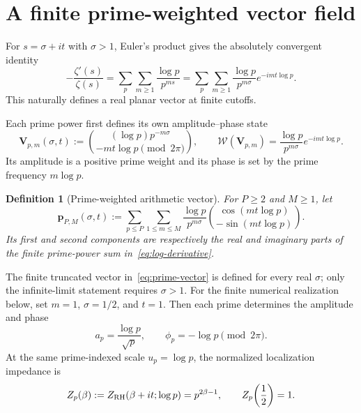 \documentclass[11pt]{article}
\newtheorem{definition}{Definition}[section]
\begin{document}
\section{A finite prime-weighted vector field}
For $s=\sigma+it$ with $\sigma>1$, Euler's product gives the absolutely convergent
identity \cite{Riemann,Titchmarsh,DLMFdefinition}
\begin{equation}\label{eq:log-derivative}
 -\frac{\zeta'(s)}{\zeta(s)}
 =\sum_{p}\sum_{m\ge1}\frac{\log p}{p^{ms}}
 =\sum_p\sum_{m\ge1}\frac{\log p}{p^{m\sigma}}
   e^{-im t\log p}.
\end{equation}
This naturally defines a real planar vector at finite cutoffs.

Each prime power first defines its own amplitude--phase state
\begin{equation}\label{eq:prime-mode-state}
 \mathbf V_{p,m}(\sigma,t)
 :=\binom{(\log p)p^{-m\sigma}}{-mt\log p\pmod{2\pi}},
 \qquad
 \mathcal W(\mathbf V_{p,m})
 =\frac{\log p}{p^{m\sigma}}e^{-imt\log p}.
\end{equation}
Its amplitude is a positive prime weight and its phase is set by the prime frequency
$m\log p$.

\begin{definition}[Prime-weighted arithmetic vector]\label{def:prime-vector}
For $P\ge2$ and $M\ge1$, let
\begin{equation}\label{eq:prime-vector}
 \boxed{
 \mathbf p_{P,M}(\sigma,t)
 :=\sum_{p\le P}\sum_{1\le m\le M}
 \frac{\log p}{p^{m\sigma}}
 \binom{\cos(mt\log p)}{-\sin(mt\log p)}.}
\end{equation}
Its first and second components are respectively the real and imaginary parts of the finite
prime-power sum in~\eqref{eq:log-derivative}.
\end{definition}

The finite truncated vector in~\eqref{eq:prime-vector} is defined for every real $\sigma$;
only the infinite-limit statement requires $\sigma>1$.  For the finite numerical realization
below, set $m=1$, $\sigma=1/2$, and $t=1$.  Then each prime
determines the amplitude and phase
\begin{equation}\label{eq:prime-sample-state}
 a_p=\frac{\log p}{\sqrt p},\qquad
 \phi_p=-\log p\pmod{2\pi}.
\end{equation}
At the same prime-indexed scale $u_p=\log p$, the normalized localization impedance is
\begin{equation}\label{eq:prime-indexed-impedance}
 Z_p(\beta):=Z_{\rm RH}(\beta+it;\log p)=p^{2\beta-1},
 \qquad Z_p\!\left(\frac12\right)=1.
\end{equation}
\end{document}
